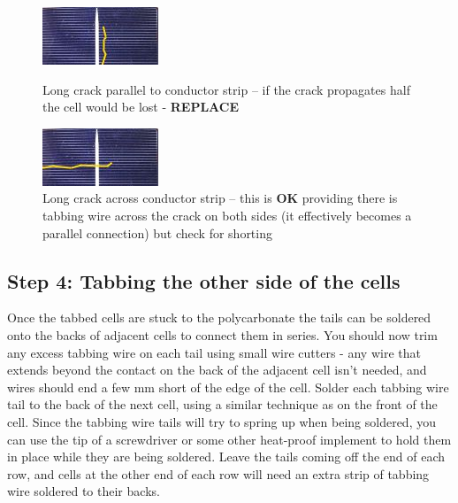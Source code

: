 \documentclass{article}
\theoremstyle{definition}
\theoremstyle{definition}
\theoremstyle{remark}
\begin{document}
    \begin{figure}[!ht]
      \begin{minipage}{0.45\textwidth}
          \centering
          \includegraphics[]{../Images/image_3_17_(long_crack_parallel).png}
          \caption*{Long crack parallel to conductor strip – if the crack propagates half the cell would be lost - \textbf{REPLACE}}
      \end{minipage}\hfill
      \begin{minipage}{0.45\textwidth}
          \centering
          \includegraphics[]{../Images/image_3_18_(long_crack_across).png}
          \caption*{Long crack across conductor strip – this is \textbf{OK} providing there is tabbing wire across the crack on both sides (it effectively becomes a parallel connection) but check for shorting}
      \end{minipage}
    \end{figure}


  {\color{blue}\subsection{Step 4: Tabbing the other side of the cells}} %
  \label{sub:step_4_tabbing_the_other_side_of_the_cells}

    Once the tabbed cells are stuck to the polycarbonate the tails can be soldered onto the backs of adjacent cells to connect them in series. You should now trim any excess tabbing wire on each tail using small wire cutters - any wire that extends beyond the contact on the back of the adjacent cell isn’t needed, and wires should end a few mm short of the edge of the cell. Solder each tabbing wire tail to the back of the next cell, using a similar technique as on the front of the cell. Since the tabbing wire tails will try to spring up when being soldered, you can use the tip of a screwdriver or some other heat-proof implement to hold them in place while they are being soldered. Leave the tails coming off the end of each row, and cells at the other end of each row will need an extra strip of tabbing wire soldered to their backs.
\end{document}
